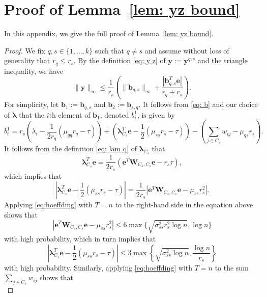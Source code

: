 \documentclass[twoside,11pt]{article}
\renewcommand{\b}{{\bs{b}}}
\newcommand{\e}{\bs {e}}
\newcommand{\bs}{\boldsymbol}
\newcommand{\W}{\bs {W}}
\newcommand{\0}{\bs{0}}
\newcommand{\bra}[1]{\ensuremath{\left\{ #1 \right\}}} %
\begin{document}
\section{Proof of Lemma~\ref{lem: yz bound}}
\label{app: yz}
In this appendix, we give the full proof of Lemma~\ref{lem: yz bound}.
\begin{proof}
We fix $q,s \in \{1,\dots,k\}$ such that $q \neq s$ and assume without loss of generality that $r_q \leq r_s$.
By the definition \eqref{eq: y z} of $\bs{y} := \bs{y}^{q,s}$ and the triangle inequality, we have
\begin{equation}
\label{eq:y_inf}
	\|\bs{y}\|_{\infty} \leq \frac{1}{r_s}\left( \|\bs{b}_{q,s}\|_{\infty} + \frac{|\bs{b}_{q,s}^T \bs{e}|}{r_q +r_s}\right).
\end{equation}
For simplicity, let \(\b_1:= \b_{q,s}\) and \(\b_2 := \b_{s,q}\).
It follows from \eqref{eq: b} and our choice of $\bs{\lambda}$  that the $i$th element of $\bs{b}_1$, denoted $b_i^1$, is given by
$$
	b_i^1 = r_s \left( \lambda_i -\frac{1}{2r_q}(\mu_{qq} r_q - \tau) \right) + \left(\bs{\lambda}_{C_s}^T\bs{e} - \frac{1}{2}(\mu_{ss} r_s - \tau) \right) - \left( \sum_{j \in C_s} w_{ij} - \mu_{qs} r_s \right).
$$
It follows from the definition \eqref{eq: lam q} of $\bs{\lambda}_{C_s}$  that
$$
	\bs{\lambda}_{C_s}^T\bs{e} = \frac{1}{2 r_s}\left(\bs{e}^T\bs{W}_{C_s,C_s}\bs{e} - r_s \tau \right),
$$
which implies that
$$
	\left| \bs{\lambda}_{C_s}^T\bs{e} - \frac{1}{2}(\mu_{ss} r_s - \tau)  \right| = \frac{1}{2r_s}\left|\bs{e}^T\bs{W}_{C_s,C_s}\bs{e}-\mu_{ss} r_s^2 \right|.
$$
Applying \eqref{eq:hoeffding} with $T = n$ to the right-hand side in the equation above shows that
\begin{equation} \label{cluster sum}
	|\e^T \W_{C_s, C_s} \e - \mu_{ss} r_s^2 |
	 \le 6 \max \{ \sqrt{\sigma_{ss}^2 r_s^2 \log n}, \log n \}
\end{equation}
with high probability,
which in turn implies that
\begin{equation} \label{lam sum}
	\left| \bs{\lambda}_{C_s}^T\bs{e} - \frac{1}{2}(\mu_{ss} r_s - \tau)
	\right| \le 3 \max\bra{ \sqrt{\sigma_{ss}^2  \log n}, \frac{\log n}{r_s} }
\end{equation}
with high probability.
Similarly, applying \eqref{eq:hoeffding} with $T=n$ to the sum $\sum_{j\in C_s} w_{ij}$ shows that
\begin{equation} \label{out sum}

\end{equation}
\end{proof}
\end{document}
